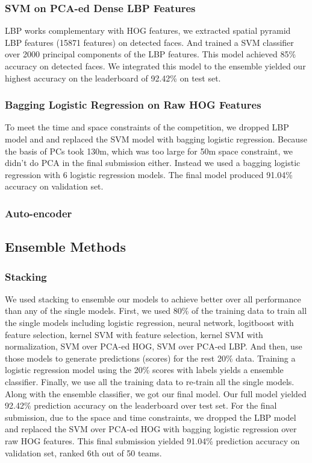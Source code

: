 \subsubsection{SVM on PCA-ed Dense LBP Features}
LBP works complementary with HOG features, we extracted spatial pyramid LBP features (15871 features) on detected faces. And trained a SVM classifier over 2000 principal components of the LBP features. This model achieved 85\% accuracy on detected faces. We integrated this model to the ensemble yielded our highest accuracy on the leaderboard of 92.42\% on test set.
\subsubsection{Bagging Logistic Regression on Raw HOG Features}
To meet the time and space constraints of the competition, we dropped LBP model and and replaced the SVM model with bagging logistic regression. Because the basis of PCs took 130m, which was too large for 50m space constraint, we didn't do PCA in the final submission either. Instead we used a bagging logistic regression with 6 logistic regression  models. The final model produced 91.04\% accuracy on validation set.
\subsubsection{Auto-encoder}
\subsection{Ensemble Methods}
\subsubsection{Stacking}
We used stacking to ensemble our models to achieve better over all performance than any of the single models. First, we used 80\% of the training data to train all the single models including logistic regression, neural network, logitboost with feature selection, kernel SVM with feature selection, kernel SVM with normalization, SVM over PCA-ed HOG, SVM over PCA-ed LBP. And then, use those models to generate predictions (scores) for the rest 20\% data. Training a logistic regression model using the 20\% scores with labels yields a ensemble classifier. Finally, we use all the training data to re-train all the single models. Along with the ensemble classifier, we got our final model. Our full model yielded 92.42\% prediction accuracy on the leaderboard over test set. For the final submission, due to the space and time constraints, we dropped the LBP model and replaced the SVM over PCA-ed HOG with bagging logistic regression over raw HOG features. This final submission yielded 91.04\% prediction accuracy on validation set, ranked 6th out of 50 teams.
